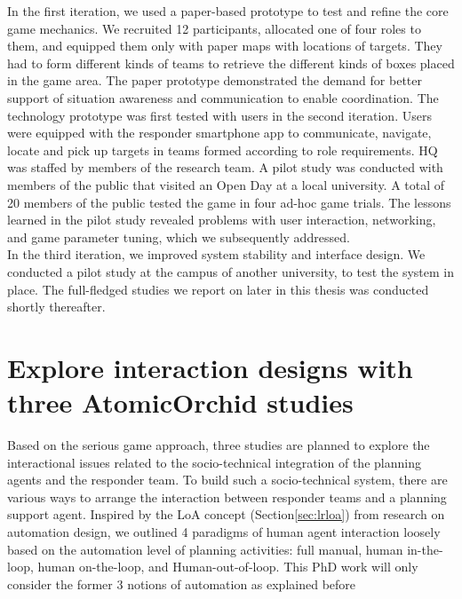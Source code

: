 In the first iteration, we used a paper-based prototype to test and refine the core game mechanics. We recruited 12 participants, allocated one of four roles to them, and equipped them only with paper maps with locations of targets. They had to form different kinds of teams to retrieve the different kinds of boxes placed in the game area. The paper prototype demonstrated the demand for better support of situation awareness and communication to enable coordination. The technology prototype was first tested with users in the second iteration. Users were equipped with the responder smartphone app to communicate, navigate, locate and pick up targets in teams formed according to role requirements. HQ was staffed by members of the research team. A pilot study was conducted with members of the public that visited an Open Day at a local university. A total of 20 members of the public tested the game in four ad-hoc game trials. The lessons learned in the pilot study revealed problems with user interaction, networking, and game parameter tuning, which we subsequently addressed.\\

In the third iteration, we improved system stability and interface design. We conducted a pilot study at the campus of another university, to test the system in place. The full-fledged studies we report on later in this thesis was conducted shortly thereafter.\\


\section{Explore interaction designs with three AtomicOrchid studies}\label{sec:patterns} \label{sec:approachPatterns}


Based on the serious game approach, three studies are planned to explore the interactional issues related to the socio-technical integration of the planning agents and the responder team. To build such a socio-technical system, there are various ways to arrange the interaction between responder teams and a planning support agent. Inspired by the \acf{LoA} concept (Section\ref{sec:lrloa}) from research on automation design, we outlined 4 paradigms of human agent interaction loosely based on the automation level of planning activities: full manual, human in-the-loop, human on-the-loop, and Human-out-of-loop. This PhD work will only consider the former 3 notions of automation as explained before\\

